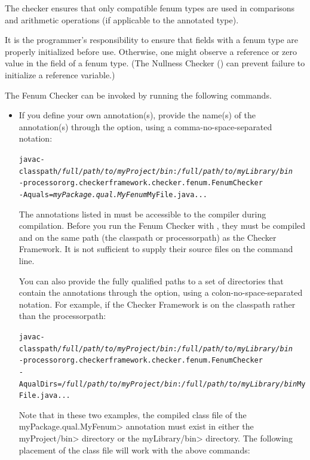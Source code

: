 The checker ensures that
only compatible fenum types are used in comparisons and arithmetic operations
(if applicable to the annotated type).

It is the programmer's responsibility to ensure that fields with a fenum type
are properly initialized before use.  Otherwise, one might observe a 
reference or zero value in the field of a fenum type.  (The Nullness Checker
() can prevent failure to initialize a
reference variable.)



The Fenum Checker can be invoked by running the following commands.

\begin{itemize}
  \item
If you define your own annotation(s), provide the name(s) of the annotation(s)
through the  option, using a comma-no-space-separated notation:

\begin{alltt}
  javac -classpath \textit{/full/path/to/myProject/bin}:\textit{/full/path/to/myLibrary/bin} \ttbs
        -processor org.checkerframework.checker.fenum.FenumChecker \ttbs
        -Aquals=\textit{myPackage.qual.MyFenum} MyFile.java ...
\end{alltt}

The annotations listed in  must be accessible to
the compiler during compilation.  Before you run the Fenum Checker with
, they must be compiled and on the same path (the classpath or
processorpath) as the Checker Framework.  It
is not sufficient to supply their source files on the command line.

You can also provide the fully qualified paths to a set of directories
that contain the annotations through the  option,
using a colon-no-space-separated notation. For example,
if the Checker Framework is on the classpath rather than the processorpath:

\begin{alltt}
  javac -classpath \textit{/full/path/to/myProject/bin}:\textit{/full/path/to/myLibrary/bin} \ttbs
        -processor org.checkerframework.checker.fenum.FenumChecker \ttbs
        -AqualDirs=\textit{/full/path/to/myProject/bin}:\textit{/full/path/to/myLibrary/bin} MyFile.java ...
\end{alltt}

Note that in these two examples, the compiled class file of the
\<myPackage.qual.MyFenum> annotation must exist in either the \<myProject/bin>
directory or the \<myLibrary/bin> directory. The following placement of
the class file will work with the above commands:


\end{itemize}
